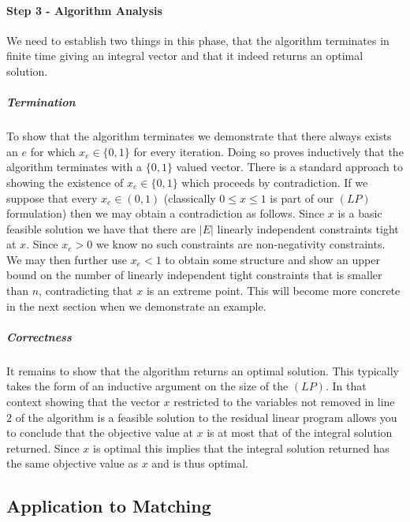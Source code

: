 \paragraph{Step 3 - Algorithm Analysis}
We need to establish two things in this phase, that the algorithm terminates in finite time giving an integral vector and that it indeed returns an optimal solution.
\subparagraph{Termination} To show that the algorithm terminates we demonstrate that there always exists an $e$ for which $x_e \in \{0,1\}$ for every iteration. Doing so proves inductively that the algorithm terminates with a $\{0,1\}$ valued vector. There is a standard approach to showing the existence of $x_e \in \{0,1\}$ which proceeds by contradiction. If we suppose that every $x_e \in (0,1)$ (classically $0\leq x \leq 1$ is part of our $(LP)$ formulation) then we may obtain a contradiction as follows. Since $x$ is a basic feasible solution we have that there are $|E|$ linearly independent constraints tight at $x$. Since $x_e > 0$ we know no such constraints are non-negativity constraints. We may then further use $x_e < 1$ to obtain some structure and show an upper bound on the number of linearly independent tight constraints that is smaller than $n$, contradicting that $x$ is an extreme point. This will become more concrete in the next section when we demonstrate an example.
\subparagraph{Correctness} It remains to show that the algorithm returns an optimal solution. This typically takes the form of an inductive argument on the size of the $(LP)$. In that context showing that the vector $x$ restricted to the variables not removed in line $2$ of the algorithm is a feasible solution to the residual linear program allows you to conclude that the objective value at $x$ is at most that of the integral solution returned. Since $x$ is optimal this implies that the integral solution returned has the same objective value as $x$ and is thus optimal.
\subsection{Application to Matching}
